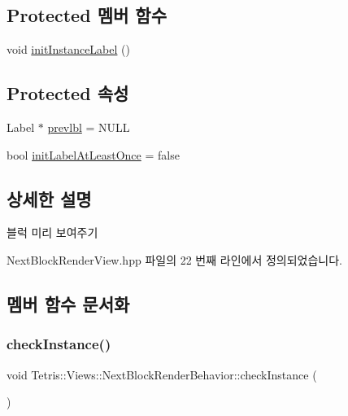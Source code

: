 \subsection*{Protected 멤버 함수}
\begin{DoxyCompactItemize}
\item 
void \hyperlink{class_tetris_1_1_views_1_1_next_block_render_behavior_a71f46d8714e29a672ae20b0af5f4db2e}{init\+Instance\+Label} ()
\end{DoxyCompactItemize}
\subsection*{Protected 속성}
\begin{DoxyCompactItemize}
\item 
Label $\ast$ \hyperlink{class_tetris_1_1_views_1_1_next_block_render_behavior_afc0dbfd7dbdf66e88a804a109b470546}{prevlbl} = N\+U\+LL
\item 
bool \hyperlink{class_tetris_1_1_views_1_1_next_block_render_behavior_ab0185d337e0b137ed985aeebef5f3b43}{init\+Label\+At\+Least\+Once} = false
\end{DoxyCompactItemize}


\subsection{상세한 설명}
블럭 미리 보여주기 

Next\+Block\+Render\+View.\+hpp 파일의 22 번째 라인에서 정의되었습니다.



\subsection{멤버 함수 문서화}
\mbox{\label{class_tetris_1_1_views_1_1_next_block_render_behavior_a5593a27688fa599f7315c48ee0a0dfb6}} 
\subsubsection{\texorpdfstring{check\+Instance()}{checkInstance()}}
{\footnotesize\ttfamily void Tetris\+::\+Views\+::\+Next\+Block\+Render\+Behavior\+::check\+Instance (\begin{DoxyParamCaption}{ }\end{DoxyParamCaption})\hspace{0.3cm}{\ttfamily [inline]}}



